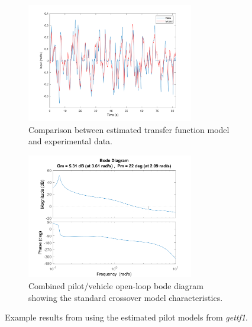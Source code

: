 \begin{figure}[t]
    \centering
    \begin{subfigure}[b]{\textwidth}
        \centering
        \includegraphics[width=0.8\textwidth]{figures/Modeling/model_output.png}
        \caption[Comparison between estimated transfer function model and experimental data]{Comparison between estimated transfer function model and experimental data.}
        \label{fig:comparison}
    \end{subfigure}
    \hfill
    \begin{subfigure}[b]{\textwidth}
        \centering
        \includegraphics[width=0.8\textwidth]{figures/Modeling/YpYc_204.png}
        \caption[Combined pilot/vehicle open-loop bode diagram]{Combined pilot/vehicle open-loop bode diagram showing the standard crossover model characteristics.}
        \label{fig:bode}
    \end{subfigure}
    \caption[Example results from using the estimated pilot models from \textit{gettf1}]{Example results from using the estimated pilot models from \textit{gettf1}.}
\end{figure}

